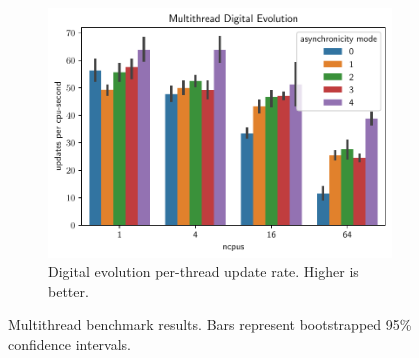 \begin{figure}[thpb]
    \begin{subfigure}[b]{0.49\textwidth}
    \includegraphics[width=\linewidth]{chart/multithread-digital-evolution}
    \caption{Digital evolution per-thread update rate. Higher is better.}
         \label{fig:multithread_digital_evolution_update_rate}
    \end{subfigure}

    \caption{Multithread benchmark results. Bars represent bootstrapped 95\% confidence intervals. }
      \label{fig:multithread_benchmarks}
  \end{figure}
